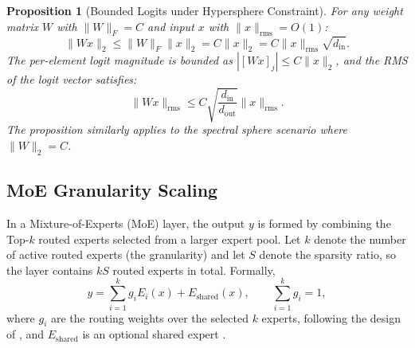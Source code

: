 \documentclass{article}
\newtheorem{proposition}[theorem]{Proposition}
\begin{document}
\begin{proposition}[Bounded Logits under Hypersphere Constraint]\label{prop:bounded}
For any weight matrix $W$ with $\|W\|_F = C $ and input $x$ with $\|x\|_{\mathrm{rms}} = O(1)$:
\begin{equation}
\|Wx\|_2 \leq  \|W\|_F \|x\|_2 = C \|x\|_2 = C  \|x\|_{\mathrm{rms}} \sqrt{d_{\mathrm{in}}}.
\end{equation}
The per-element logit magnitude is bounded as $|[Wx]_j| \leq C \|x\|_2$, and the RMS of the logit vector satisfies:
\begin{equation}
\|Wx\|_{\mathrm{rms}} \leq C \sqrt{\frac{d_{\mathrm{in}}}{d_{\mathrm{out}}}} \|x\|_{\mathrm{rms}}.
\end{equation}
The proposition similarly applies to the spectral sphere scenario where $\|W\|_2 = C $.
\end{proposition}







\subsection{MoE Granularity Scaling}
\label{sec:moe-theory}

In a Mixture-of-Experts (MoE) \cite{DBLP:conf/iclr/ShazeerMMDLHD17} layer, the output $y$ is formed by combining the Top-$k$ routed experts selected from a larger expert pool. Let $k$ denote the number of active routed experts (the granularity) and let $S$ denote the sparsity ratio, so the layer contains $kS$ routed experts in total. Formally,
\begin{equation}
y = \sum_{i=1}^{k} g_i E_i(x) + E_{\text{shared}}(x),
\qquad \sum_{i=1}^{k} g_i = 1,
\end{equation}
where $g_i$ are the routing weights over the selected $k$ experts, following the design of \cite{DBLP:conf/iclr/ShazeerMMDLHD17, openai2025gpt0oss0120b}, and $E_{\text{shared}}$ is an optional shared expert \cite{deepseek-ai2024deepseekv2}.
\end{document}
